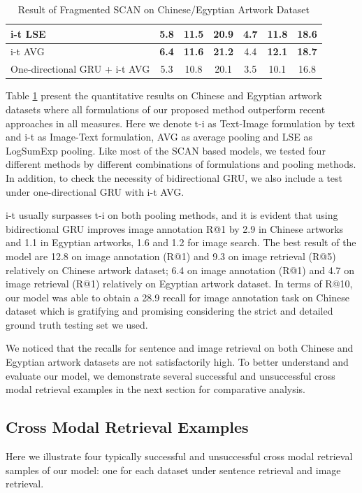 \begin{table}[h!]
\begin{tabular}{lcccccc}
i-t LSE              & 5.8         & 11.5        & 20.9       & \textbf{4.7}        & 11.8       & 18.6      \\ \hline
i-t AVG              & \textbf{6.4}         & \textbf{11.6}        & \textbf{21.2}       & 4.4        & \textbf{12.1}       & \textbf{18.7}      \\ \hline
One-directional GRU + i-t AVG  & 5.3         & 10.8        & 20.1       & 3.5        & 10.1       & 16.8      \\ \hline\hline
\end{tabular}
\caption{Result of Fragmented SCAN on Chinese/Egyptian Artwork Dataset}
\label{table:resultfragmented}
\end{table}

Table \ref{table:resultfragmented} present the quantitative results on Chinese and Egyptian artwork datasets where all formulations of our proposed method outperform recent approaches in all measures. Here we denote t-i as Text-Image formulation by text and i-t as Image-Text formulation, AVG as average pooling and LSE as LogSumExp pooling. Like most of the SCAN based models, we tested four different methods by different combinations of formulations and pooling methods. In addition, to check the necessity of bidirectional GRU, we also include a test under one-directional GRU with i-t AVG.

i-t usually surpasses t-i on both pooling methods, and it is evident that using bidirectional GRU improves image annotation R@1 by 2.9 in Chinese artworks and 1.1 in Egyptian artworks, 1.6 and 1.2 for image search. The best result of the model are 12.8 on image annotation (R@1) and 9.3 on image retrieval (R@5) relatively on Chinese artwork dataset; 6.4 on image annotation (R@1) and 4.7 on image retrieval (R@1) relatively on Egyptian artwork dataset. In terms of R@10, our model was able to obtain a 28.9 recall for image annotation task on Chinese dataset which is gratifying and promising considering the strict and detailed ground truth testing set we used.

We noticed that the recalls for sentence and image retrieval on both Chinese and Egyptian artwork datasets are not satisfactorily high. To better understand and evaluate our model, we demonstrate several successful and unsuccessful cross modal retrieval examples in the next section for comparative analysis.

\subsection{Cross Modal Retrieval Examples}
Here we illustrate four typically successful and unsuccessful cross modal retrieval samples of our model: one for each dataset under sentence retrieval and image retrieval. 

